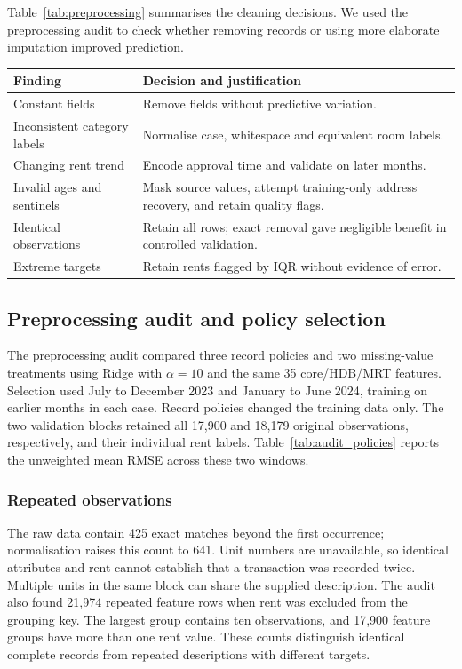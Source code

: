 \documentclass[conference]{IEEEtran}
\makeatletter
\newenvironment{localtable}{\par\addvspace{\medskipamount}\noindent
  \begin{minipage}{\columnwidth}\def\@captype{table}}{\end{minipage}\par
  \addvspace{\medskipamount}}
\makeatother
\begin{document}
Table~\ref{tab:preprocessing} summarises the cleaning decisions. We used
the preprocessing audit to check whether removing records or using more
elaborate imputation improved prediction.

\begin{localtable}
  \caption{EDA findings and the corresponding preprocessing decisions.}
  \label{tab:preprocessing}
  \centering
  \small
  \begin{tabularx}{\columnwidth}{p{}X}
    \toprule
    Finding & Decision and justification \\
    \midrule
    Constant fields & Remove fields without predictive variation. \\
    Inconsistent category labels & Normalise case, whitespace and equivalent
    room labels. \\
    Changing rent trend & Encode approval time and validate on later months. \\
    Invalid ages and sentinels & Mask source values, attempt training-only
    address recovery, and retain quality flags. \\
    Identical observations & Retain all rows; exact removal gave negligible
    benefit in controlled validation. \\
    Extreme targets & Retain rents flagged by IQR without evidence of error. \\
    \bottomrule
  \end{tabularx}
\end{localtable}

\subsection{Preprocessing audit and policy selection}
\label{sec:preprocessing_audit}
The preprocessing audit compared three record policies and two missing-value
treatments using Ridge with $\alpha=10$ and the same 35 core/HDB/MRT features.
Selection used July to December 2023 and January to June 2024, training on
earlier months in each case. Record policies changed the training data only.
The two validation blocks retained all 17,900 and 18,179 original observations,
respectively, and their individual rent labels. Table~\ref{tab:audit_policies}
reports the unweighted mean RMSE across these two windows.

\subsubsection{Repeated observations}
The raw data contain 425 exact matches beyond the first occurrence;
normalisation raises this count to 641. Unit numbers are unavailable, so
identical attributes and rent cannot establish that a transaction was recorded
twice. Multiple units in the same block can share the supplied description.
The audit also found 21,974 repeated feature rows when rent was excluded from
the grouping key. The largest group contains ten observations, and 17,900
feature groups have more than one rent value. These counts distinguish
identical complete records from repeated descriptions with different targets.
\end{document}
